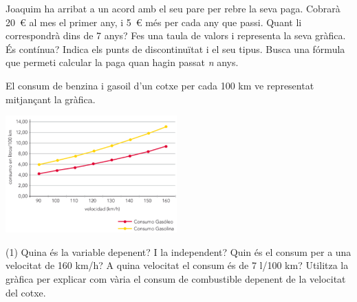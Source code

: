 \begin{mylist}
\exer  Joaquim ha arribat a un acord amb el seu pare per rebre la seva paga. Cobrarà 20~€ al mes el primer any, i 5~€ més per cada any que passi. Quant li correspondrà dins de 7 anys? Fes una taula de valors i representa la seva gràfica. És contínua? Indica els punts de discontinuïtat i el seu tipus. Busca una fórmula que permeti calcular la paga quan hagin passat \textit{n} anys.


	\exer  
	El consum de benzina i gasoil d'un cotxe per cada 100 km ve representat mitjançant la gràfica.
	
	\begin{minipage}{0.4\textwidth}
		\centering
		\includegraphics[height=4.5cm]{img-08/consumo}
	\end{minipage}
	\begin{minipage}{0.55\textwidth}
	\begin{tasks}(1)
		\task  Quina és la variable depenent? 
		\task  I la independent?
		\task  Quin és el consum per a una velocitat de 160 km/h?
		\task  A quina velocitat el consum és de 7 l/100 km?
		\task  Utilitza la gràfica per explicar com vària el consum de combustible depenent de la velocitat del cotxe.
	\end{tasks}
	\end{minipage}

  

\end{mylist}
